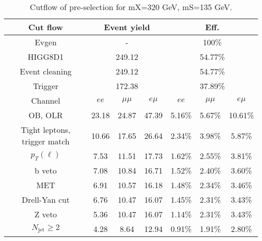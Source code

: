 \begin{table}
\centering\small
\begin{tabular}{c|ccc|ccc}
\hline
\hline
Cut flow &\multicolumn{3}{c|}{Event yield}&\multicolumn{3}{c}{Eff.}      \\
\hline
Evgen&\multicolumn{3}{c|}{-}&\multicolumn{3}{c}{100\%}\\
HIGG8D1&\multicolumn{3}{c|}{249.12}&\multicolumn{3}{c}{54.77\%}\\
Event cleaning&\multicolumn{3}{c|}{249.12}&\multicolumn{3}{c}{54.77\%}\\
Trigger&\multicolumn{3}{c|}{172.38    }&\multicolumn{3}{c}{37.89\%}\\
Channel&$ee$&$\mu\mu$&$e\mu$&$ee$&$\mu\mu$&$e\mu$\\
\hline
OB, OLR    &23.18    &24.87    &47.39& 5.16\%    &5.67\%    &10.61\%\\
Tight leptons, trigger match    &10.66    &17.65    &26.64    &2.34\%    &3.98\%    &5.87\%\\
$p_T(\ell)$    &7.53    &11.51    &17.73    &1.62\%    &2.55\%    &3.81\%\\
b veto    &7.08    &10.84    &16.71    &1.52\%    &2.40\%    &3.60\%\\
MET    &6.91    &10.57    &16.18    &1.48\%    &2.34\%    &3.46\%\\
Drell-Yan cut    &6.76    &10.47    &16.07    &1.45\%    &2.31\%    &3.43\%\\
Z veto    &5.36    &10.47    &16.07    &1.14\%    &2.31\%    &3.43\%\\
$N_{\text{jet}}\geq2$    &4.28    &8.64    &12.94    &0.91\%    &1.91\%    &2.80\%\\
\hline
\hline
\end{tabular}
\caption{Cutflow of pre-selection for mX=320 GeV, mS=135 GeV.}
\label{tab:cut_flow_preselection_mX260}
\end{table}
